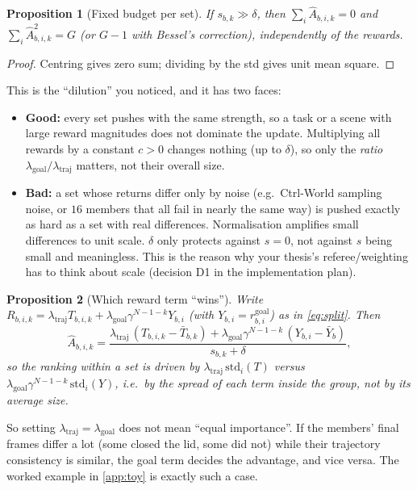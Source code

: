 \documentclass[11pt,a4paper]{article}
\newcommand{\Ah}{\hat A}
\newtheorem{proposition}{Proposition}
\theoremstyle{remark}
\begin{document}
\begin{proposition}[Fixed budget per set]\label{prop:budget}
If $s_{b,k}\gg\delta$, then $\sum_{i}\Ah_{b,i,k}=0$ and $\sum_i\Ah_{b,i,k}^2=G$ (or $G-1$ with Bessel's correction), independently of the rewards.
\end{proposition}
\begin{proof}
Centring gives zero sum; dividing by the std gives unit mean square.
\end{proof}
This is the ``dilution'' you noticed, and it has two faces:
\begin{itemize}
\item \textbf{Good:} every set pushes with the same strength, so a task or a scene with large reward magnitudes does not dominate the update. Multiplying all rewards by a constant $c>0$ changes nothing (up to $\delta$), so only the \emph{ratio} $\lambda_{\mathrm{goal}}/\lambda_{\mathrm{traj}}$ matters, not their overall size.
\item \textbf{Bad:} a set whose returns differ only by noise (e.g.\ Ctrl-World sampling noise, or $16$ members that all fail in nearly the same way) is pushed exactly as hard as a set with real differences. Normalisation amplifies small differences to unit scale. $\delta$ only protects against $s=0$, not against $s$ being small and meaningless. This is the reason why your thesis's referee/weighting has to think about scale (decision D1 in the implementation plan).
\end{itemize}

\begin{proposition}[Which reward term ``wins'']\label{prop:mix}
Write $R_{b,i,k}=\lambda_{\mathrm{traj}}T_{b,i,k}+\lambda_{\mathrm{goal}}\gamma^{N-1-k}Y_{b,i}$ (with $Y_{b,i}=r^{\mathrm{goal}}_{b,i}$) as in \eqref{eq:split}. Then
\[
\Ah_{b,i,k}=\frac{\lambda_{\mathrm{traj}}\,(T_{b,i,k}-\bar T_{b,k})+\lambda_{\mathrm{goal}}\gamma^{N-1-k}\,(Y_{b,i}-\bar Y_{b})}{s_{b,k}+\delta},
\]
so the ranking within a set is driven by $\lambda_{\mathrm{traj}}\,\mathrm{std}_i(T)$ versus $\lambda_{\mathrm{goal}}\gamma^{N-1-k}\,\mathrm{std}_i(Y)$, i.e.\ by the \emph{spread} of each term inside the group, not by its average size.
\end{proposition}
So setting $\lambda_{\mathrm{traj}}=\lambda_{\mathrm{goal}}$ does not mean ``equal importance''. If the members' final frames differ a lot (some closed the lid, some did not) while their trajectory consistency is similar, the goal term decides the advantage, and vice versa. The worked example in \cref{app:toy} is exactly such a case.
\end{document}
